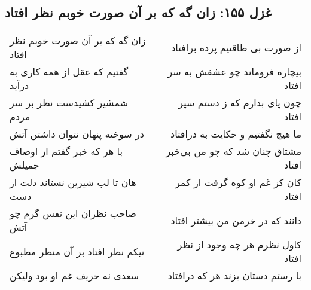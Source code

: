 \begin{center}
\section*{غزل ۱۵۵: زان گه که بر آن صورت خوبم نظر افتاد}
\label{sec:155}
\begin{longtable}{l p{0.5cm} r}
زان گه که بر آن صورت خوبم نظر افتاد
&&
از صورت بی طاقتیم پرده برافتاد
\\
گفتیم که عقل از همه کاری به درآید
&&
بیچاره فروماند چو عشقش به سر افتاد
\\
شمشیر کشیدست نظر بر سر مردم
&&
چون پای بدارم که ز دستم سپر افتاد
\\
در سوخته پنهان نتوان داشتن آتش
&&
ما هیچ نگفتیم و حکایت به درافتاد
\\
با هر که خبر گفتم از اوصاف جمیلش
&&
مشتاق چنان شد که چو من بی‌خبر افتاد
\\
هان تا لب شیرین نستاند دلت از دست
&&
کان کز غم او کوه گرفت از کمر افتاد
\\
صاحب نظران این نفس گرم چو آتش
&&
دانند که در خرمن من بیشتر افتاد
\\
نیکم نظر افتاد بر آن منظر مطبوع
&&
کاول نظرم هر چه وجود از نظر افتاد
\\
سعدی نه حریف غم او بود ولیکن
&&
با رستم دستان بزند هر که درافتاد
\\
\end{longtable}
\end{center}
